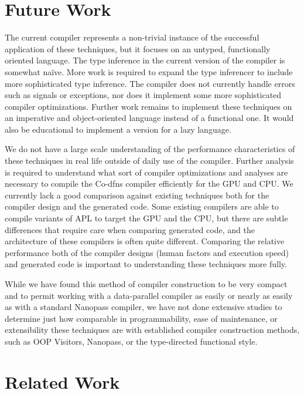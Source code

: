 \documentclass[numbers,preprint]{sigplanconf}
\begin{document}
\section{Future Work}

The current compiler represents a non-trivial instance of
the successful application of these techniques, but it focuses on an untyped, 
functionally oriented language. The type inference in the current version 
of the compiler is somewhat na\"ive. More work is required to expand the 
type inferencer to include more sophisticated type inference. 
The compiler does not currently handle errors such as signals or 
exceptions, nor does it implement some more sophisticated compiler optimizations.
Further work remains to implement these techniques on an imperative and 
object-oriented language instead of a functional one. It would also be 
educational to implement a version for a lazy language. 

We do not have a large scale understanding of the performance characteristics 
of these techniques in real life outside of daily use of the compiler.
Further analysis is
required to understand what sort of compiler optimizations and analyses are 
necessary to compile the Co-dfns compiler efficiently for the GPU and CPU. 
We currently lack a good comparison against existing techniques both for 
the compiler design and the generated code. Some existing compilers are able 
to compile variants of APL to target the GPU and the CPU, but there are subtle 
differences that require care when comparing generated code, and the 
architecture of these compilers is often quite different. Comparing the 
relative performance both of the compiler designs (human factors and execution 
speed) and generated code is important to understanding these techniques more 
fully.

While we have found this method of compiler construction to be very compact 
and to permit working with a data-parallel compiler as easily or nearly as 
easily as with a standard Nanopass compiler, we have not done extensive 
studies to determine just how comparable in programmability, ease of 
maintenance, or extensibility these techniques are with established 
compiler construction methods, such as OOP Visitors, Nanopass, or the 
type-directed functional style.

\section{Related Work}
\end{document}
